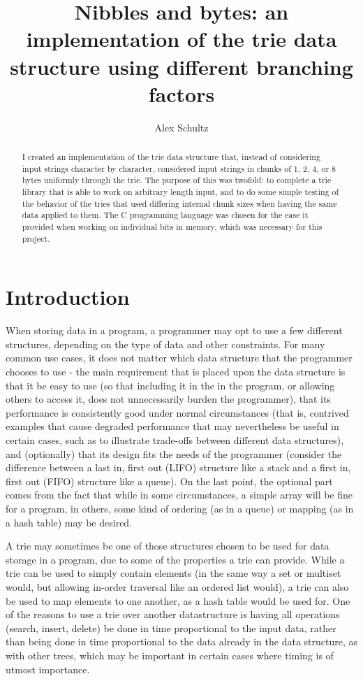 \documentclass{llncs}
\title{Nibbles and bytes: an implementation of the trie data structure using different branching factors}
\author{Alex Schultz}
\institute{Tufts University}
\begin{document}
\maketitle

\begin{abstract}
I created an implementation of the trie data structure that, instead of considering input strings character by character, considered input strings in chunks of 1, 2, 4, or 8 bytes uniformly through the trie. The purpose of this was twofold: to complete a trie library that is able to work on arbitrary length input, and to do some simple testing of the behavior of the tries that used differing internal chunk sizes when having the same data applied to them. The C programming language was chosen for the ease it provided when working on individual bits in memory, which was necessary for this project.
\end{abstract}

\section{Introduction}
\label{Introduction}
When storing data in a program, a programmer may opt to use a few different structures, depending on the type of data and other constraints. For many common use cases, it does not matter which data structure that the programmer chooses to use - the main requirement that is placed upon the data structure is that it be easy to use (so that including it in the in the program, or allowing others to access it, does not unnecessarily burden the programmer), that its performance is consistently good under normal circumstances (that is, contrived examples that cause degraded performance that may nevertheless be useful in certain cases, such as to illustrate trade-offs between different data structures), and (optionally) that its design fits the needs of the programmer (consider the difference between a last in, first out (LIFO) structure like a stack and a first in, first out (FIFO) structure like a queue). On the last point, the optional part comes from the fact that while in some circumstances, a simple array will be fine for a program, in others, some kind of ordering (as in a queue) or mapping (as in a hash table) may be desired.

A trie may sometimes be one of those structures chosen to be used for data storage in a program, due to some of the properties a trie can provide. While a trie can be used to simply contain elements (in the same way a set or multiset would, but allowing in-order traversal like an ordered list would), a trie can also be used to map elements to one another, as a hash table would be used for. One of the reasons to use a trie over another datastructure is having all operations (search, insert, delete) be done in time proportional to the input data, rather than being done in time proportional to the data already in the data structure, as with other trees, which may be important in certain cases where timing is of utmost importance.
\end{document}
